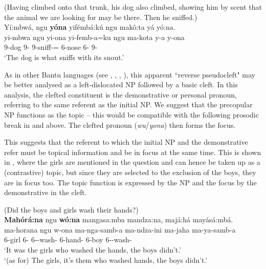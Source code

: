 \documentclass[output=paper]{langscibook}
\begin{document}
\ex
\label{bkm:Ref127264630}
(Having climbed onto that trunk, his dog also climbed, showing him by scent that the animal we are looking for may be there. Then he sniffed.)\\
Yí:mbwá, ngu \textbf{yóna} yifémbá:kú ngu makô:ta yá yó:na.\\
\gll
yi-mbwa  ngu  yi-ona  yi-femb-a=ku  ngu  ma-kota  y-a  y-ona\\
9-dog  \COP{}  9-\PRO{}  9\SM{}-sniff-\FV{}=\REL{}  \PREP{}  6-nose  6-\CONN{}  9-\PRO{}\\
\glt
‘The dog is what sniffs with its snout.’\\

\z

As in other Bantu languages (see \textcite{chapters/kirundi}, \textcite{chapters/rukiga}, \textcite{chapters/kinyakyusa}, \textcite{chapters/kiitharaka}), this apparent ``reverse pseudocleft" may be better analysed as a left-dislocated NP followed by a basic cleft. In this analysis, the clefted constituent is the demonstrative or personal pronoun, referring to the same referent as the initial NP. We suggest that the precopular NP functions as the topic – this would be compatible with the following prosodic break in  and  above. The clefted pronoun (\textit{wu}/\textit{yona}) then forms the focus.

This suggests that the referent to which the initial NP and the demonstrative refer must be topical information and be in focus at the same time. This is shown in , where the girls are mentioned in the question and can hence be taken up as a (contrastive) topic, but since they are selected to the exclusion of the boys, they are in focus too. The topic function is expressed by the NP and the focus by the demonstrative in the cleft.

\ea
\label{bkm:Ref120697758}
(Did the boys and girls wash their hands?)\\
\textbf{Mahórá:na} ngu \textbf{wó:na} mangasa:mba mandza:na, majá:há mayásá:mbá.\\
\gll
ma-horana  ngu  w-ona  ma-nga-samb-a  ma-ndza-ini  ma-jaha  ma-ya-samb-a\\
6-girl  \COP{}  6-\PRO{}  6\SM{}-\REL{}-wash-\FV{}  6-hand-\LOC{}  6-boy  6\SM{}-\NEG{}-wash-\FV{}\\
\glt
‘It was the girls who washed the hands, the boys didn’t.’\\
‘(as for) The girls, it’s them who washed hands, the boys didn’t.’
\end{document}
